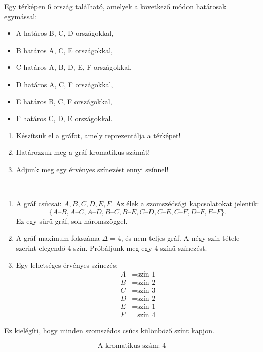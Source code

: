 \begin{extraproblem}
	Egy térképen 6 ország található, amelyek a következő módon határosak
	egymással:
	\begin{itemize}
		\item A határos B, C, D országokkal, 
		\item B határos A, C, E országokkal, 
		\item C határos A, B, D, E, F országokkal, 
		\item D határos A, C, F országokkal, 
		\item E határos B, C, F országokkal, 
		\item F határos C, D, E országokkal. 
	\end{itemize}
	\begin{enumerate}
		\item Készítsük el a gráfot, amely reprezentálja a térképet! 
		\item Határozzuk meg a gráf kromatikus számát! 
		\item Adjunk meg egy érvényes színezést ennyi színnel! 
	\end{enumerate}
\end{extraproblem}

\begin{solution}
	~
	\begin{enumerate}
		\item A gráf csúcsai: $A,B,C,D,E,F$. Az élek a szomszédsági kapcsolatokat
		jelentik: 
		\[
		\{A\text{–}B,A\text{–}C,A\text{–}D,B\text{–}C,B\text{–}E,C\text{–}D,C\text{–}E,C\text{–}F,D\text{–}F,E\text{–}F\}.
		\]
		Ez egy sűrű gráf, sok háromszöggel.
		\item A gráf maximum fokszáma $\Delta=4$, és nem teljes gráf. A négy szín
		tétele szerint elegendő 4 szín. Próbáljunk meg egy 4-színű színezést.
		\item Egy lehetséges érvényes színezés: 
		\[
		\begin{aligned}A & =\text{szín 1}\\
			B & =\text{szín 2}\\
			C & =\text{szín 3}\\
			D & =\text{szín 2}\\
			E & =\text{szín 1}\\
			F & =\text{szín 4}
		\end{aligned}
		\]
	\end{enumerate}
	Ez kielégíti, hogy minden szomszédos csúcs különböző színt kapjon.
	
	\[
	\boxed{\text{A kromatikus szám: }4}
	\]
	
\end{solution}


